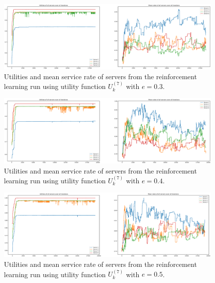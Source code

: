 \begin{figure}[H]
    \includegraphics[width=\textwidth]{chapters/00_appendix/03_more_rl_results/Bin/utility_7_eps/u7_1_e03.eps}
    \caption{Utilities and mean service rate of servers from the reinforcement
    learning run using utility function \(U_k^{(7)}\) with \(e = 0.3\).}
    \label{fig:RL_utility7_1_e03}
\end{figure}

\begin{figure}[H]
    \includegraphics[width=\textwidth]{chapters/00_appendix/03_more_rl_results/Bin/utility_7_eps/u7_1_e04.eps}
    \caption{Utilities and mean service rate of servers from the reinforcement
    learning run using utility function \(U_k^{(7)}\) with \(e = 0.4\).}
    \label{fig:RL_utility7_1_e04}
\end{figure}

\begin{figure}[H]
    \includegraphics[width=\textwidth]{chapters/00_appendix/03_more_rl_results/Bin/utility_7_eps/u7_1_e05.eps}
    \caption{Utilities and mean service rate of servers from the reinforcement
    learning run using utility function \(U_k^{(7)}\) with \(e = 0.5\).}
    \label{fig:RL_utility7_1_e05}
\end{figure}

